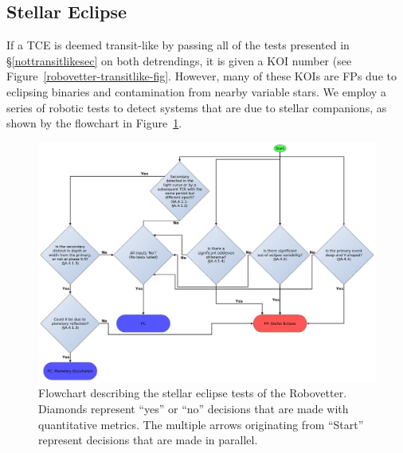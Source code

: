 \subsection{Stellar Eclipse}
\label{sigsecsec}

If a TCE is deemed transit-like by passing all of the tests presented in \S\ref{nottransitlikesec} on both detrendings, it is given a KOI number (see Figure~\ref{robovetter-transitlike-fig}.
However, many of these KOIs are FPs due to eclipsing binaries and contamination from nearby variable stars. We employ a series of robotic tests to detect systems that are due to stellar companions, as shown by the flowchart in Figure~\ref{robovetter-sigsec-fig}.







\begin{figure}[ht]
\centering
\includegraphics[width=\linewidth]{RoboVetter-Diagram-V4-SigSec.pdf}
\caption{Flowchart describing the stellar eclipse tests of the Robovetter. Diamonds represent ``yes'' or ``no'' decisions that are made with quantitative metrics. The multiple arrows originating from ``Start'' represent decisions that are made in parallel.}
\label{robovetter-sigsec-fig}
\end{figure}


